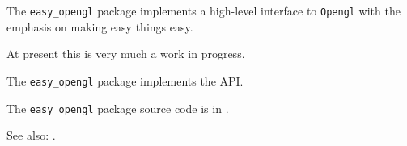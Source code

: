 
The {\tt easy\_opengl} package implements a high-level interface to 
{\tt Opengl} with the emphasis on making easy things easy.

At present this is very much a work in progress.

The {\tt easy\_opengl} package implements the  API.

The {\tt easy\_opengl} package source code is in .

See also:  .

